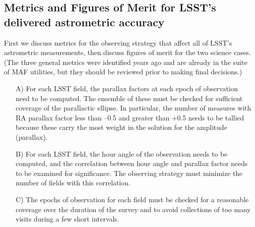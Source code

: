 


\subsection{Metrics and Figures of Merit for LSST's delivered astrometric accuracy}
\label{sec:\secname:MW_Astrometry_metrics}


First we discuss metrics for the observing strategy that affect all of
LSST's astrometric measurements, then discuss figures of merit for the
two science cases. (The three general metrics were identified years ago and
are already in the suite of MAF utilities, but they should be reviewed
prior to making final decisions.)

\begin{itemize}
\item[A)] For each LSST field, the parallax factors at each epoch of
observation need to be computed.  The ensemble of these must be checked for
sufficient coverage of the parallactic ellipse.  In particular, the number of
measures with RA parallax factor less than --0.5 and greater than +0.5
needs to be tallied because these carry the most weight in the solution
for the amplitude (parallax).
\item[B)] For each LSST field, the hour angle of the observation needs to be
computed, and the correlation between hour angle and parallax factor
needs to be examined for significance.  The observing strategy must minimize
the number of fields with this correlation.
\item[C)] The epochs of observation for each field must be checked for a
reasonable coverage over the duration of the survey and to avoid
collections of too many visits during a few short intervals.
\end{itemize}

